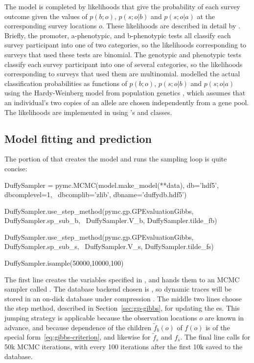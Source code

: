 \documentclass[article]{jss}
\begin{document}
The model is completed by likelihoods that give the probability of each survey outcome given the values of $p(b;o)$, $p(s;o|b)$ and $p(s;o|a)$ at the corresponding survey locations $o$. These likelihoods are described in detail by \cite{Howes}. Briefly, the promoter, a-phenotypic, and b-phenotypic tests all classify each survey participant into one of two categories, so the likelihoods corresponding to surveys that used these tests are binomial. The genotypic and phenotypic tests classify each survey participant into one of several categories, so the likelihoods corresponding to surveys that used them are multinomial. \cite{Howes} modelled the actual classification probabilities as functions of $p(b;o)$, $p(s;o|b)$ and $p(s;o|a)$ using the Hardy-Weinberg model from population genetics \citep{gillespie}, which assumes that an individual's two copies of an allele are chosen independently from a gene pool. 
The likelihoods are implemented in  using 's  and  classes.

\subsection{Model fitting and prediction}
The portion of  that creates the model and runs the sampling loop is quite concise: 
\begin{CodeInput}
DuffySampler = pymc.MCMC(model.make_model(**data), db='hdf5', dbcomplevel=1, \
    dbcomplib='zlib', dbname='duffydb.hdf5')

DuffySampler.use_step_method(pymc.gp.GPEvaluationGibbs, DuffySampler.sp_sub_b, \
    DuffySampler.V_b, DuffySampler.tilde_fb)

DuffySampler.use_step_method(pymc.gp.GPEvaluationGibbs, DuffySampler.sp_sub_s, \
    DuffySampler.V_s, DuffySampler.tilde_fs)

DuffySampler.isample(50000,10000,100)    
\end{CodeInput}
The first line creates the variables specified in , and hands them to an MCMC sampler called . The database backend chosen is , so dynamic traces will be stored in an on-disk  database under compression \citep{pymc}. The middle two lines choose the  step method, described in Section~\ref{sec:gp-gibbs}, for updating the es. This jumping strategy is applicable because the observation locations $o$ are known in advance, and because dependence of the children $\tilde f_b(o)$ of $f(o)$ is of the special form~\ref{eq:gibbs-criterion}, and likewise for $\tilde f_s$ and $f_s$. The final line calls for 50k MCMC iterations, with every 100 iterations after the first 10k saved to the database. 
\end{document}
